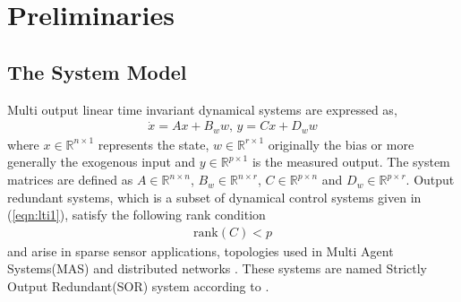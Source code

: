 \section{Preliminaries}
\subsection{The System Model}
Multi output linear time invariant dynamical systems are expressed as,
\begin{gather} 
    \dot{x}=A x+B_w w,\,y=C x+D_w w\label{eqn:lti1}
\end{gather}
where $x\in\mathbb{R}^{n\times 1}$ represents the state, $w\in\mathbb{R}^{r\times 1}$ originally the bias or more generally the exogenous input and $y\in\mathbb{R}^{p\times 1}$ is the measured output. The system matrices are defined as $A\in\mathbb{R}^{n\times n}$, $B_w\in\mathbb{R}^{n\times r}$, $C\in\mathbb{R}^{p\times n}$ and $D_w\in\mathbb{R}^{p\times r}$. Output redundant systems, which is a subset of dynamical control systems given in (\ref{eqn:lti1}), satisfy the following rank condition
\begin{gather}
    \mathrm{rank}(C)<p\label{eqn:rank_cond_sor}
\end{gather}
and arise in sparse sensor applications\cite{shoukry2015event}, topologies used in Multi Agent Systems(MAS)\cite{olfati2007consensus} and distributed networks \cite{yang2022sensor}. These systems are named Strictly Output Redundant(SOR) system according to \cite{yang2025output}. 
